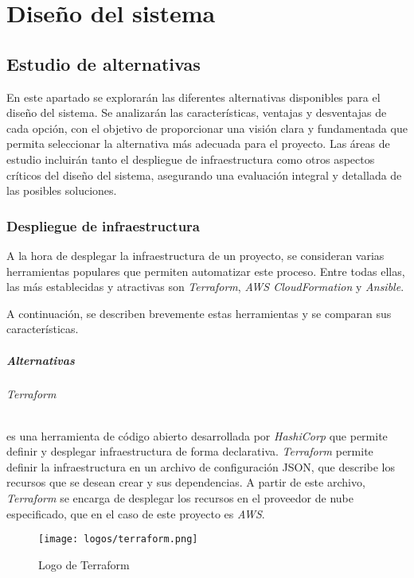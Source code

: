 \chapter{Diseño del sistema}\label{chap:diseño}
\section{Estudio de alternativas}\label{sec:estudio}
En este apartado se explorarán las diferentes alternativas disponibles para el
diseño del sistema. Se analizarán las características, ventajas y desventajas de
cada opción, con el objetivo de proporcionar una visión clara y fundamentada que
permita seleccionar la alternativa más adecuada para el proyecto. Las áreas de
estudio incluirán tanto el despliegue de infraestructura como otros aspectos
críticos del diseño del sistema, asegurando una evaluación integral y detallada
de las posibles soluciones.


\subsection{Despliegue de infraestructura}\label{subsec:herdesinf}
A la hora de desplegar la infraestructura de un proyecto, se consideran varias
herramientas populares que permiten automatizar este proceso. Entre todas ellas,
las más establecidas y atractivas son \textit{Terraform},
\textit{AWS CloudFormation} y \textit{Ansible}.

A continuación, se describen brevemente estas herramientas y se comparan sus
características.

\paragraph{Alternativas}
\subparagraph{Terraform} es una herramienta de código abierto desarrollada por
\textit{HashiCorp} que permite definir y desplegar infraestructura de forma
declarativa. \textit{Terraform} permite definir la infraestructura en un archivo
de configuración JSON, que describe los recursos que se desean crear y sus
dependencias. A partir de este archivo, \textit{Terraform} se encarga de
desplegar los recursos en el proveedor de nube especificado, que en el caso de
este proyecto es \textit{AWS}.

\begin{figure}[H]
	\centering
	\texttt{[image: logos/terraform.png]}
	\caption{Logo de Terraform~\textregistered}
	\label{fig:terraform}
\end{figure}

